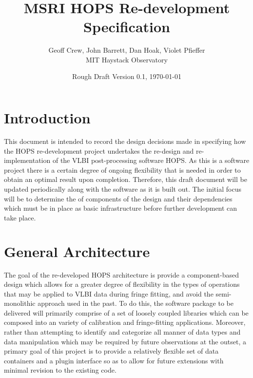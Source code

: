 \documentclass[hidelinks]{article}
\title{ \textbf{MSRI HOPS Re-development Specification} }
\author{
\large Geoff Crew, John Barrett, Dan Hoak, Violet Pfieffer \\
\Large MIT Haystack Observatory}
\date{Rough Draft Version 0.1, \today}
\let\Oldsection\section
\renewcommand{\section}{\FloatBarrier\Oldsection}
\begin{document}
\maketitle


\tiny
\tableofcontents
\normalsize
\newpage

\section{Introduction}

This document is intended to record the design decisions made in specifying how the HOPS re-development project undertakes the
re-design and re-implementation of the VLBI post-processing software HOPS. As this is a software project there is a certain
degree of ongoing flexibility that is needed in order to obtain an optimal result upon completion. Therefore, this 
draft document will be updated periodically along with the software as it is built out. The initial focus will be to determine
the of components of the design and their dependencies which must be in place as basic infrastructure before further development
can take place.


\section{General Architecture}

The goal of the re-developed HOPS architecture is provide a component-based design which allows for a greater degree of flexibility
in the types of operations that may be applied to VLBI data during fringe fitting, and avoid the semi-monolithic approach used in the past.
To do this, the software package to be delivered will primarily comprise of a set of loosely coupled libraries which can be composed
into an variety of calibration and fringe-fitting applications. Moreover, rather than attempting to identify and categorize all manner of data
types and data manipulation which may be required by future observations at the outset, a primary goal of this project is to provide a
relatively flexible set of data containers and a plugin interface so as to allow for future extensions with minimal revision to the existing code.
\end{document}
